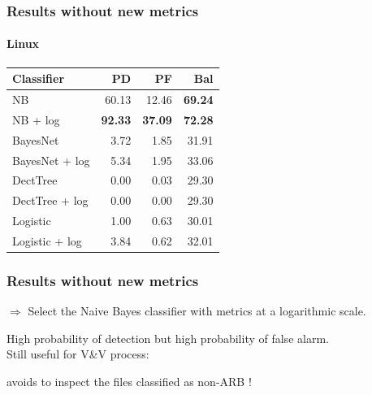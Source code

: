 \documentclass{beamer}
\begin{document}
\begin{frame}
 \frametitle{Results without new metrics}
 \framesubtitle{Linux}
 \begin{center}
 \begin{tabular}{lrrr}
  \hspace{0.2cm} Classifier & PD & PF & Bal\\
  \hline
  NB & 60.13 & 12.46 & \textbf{69.24}\\
  NB + log &  \textbf{92.33} & \textbf{37.09} & \textbf{72.28}\\
  BayesNet & 3.72 & 1.85 & 31.91\\
  BayesNet + log & 5.34 & 1.95 & 33.06\\
  DectTree & 0.00 & 0.03 & 29.30\\
  DectTree + log & 0.00 & 0.00 & 29.30\\
  Logistic & 1.00 & 0.63 & 30.01\\
  Logistic + log & 3.84 & 0.62 & 32.01\\
  \hline
 \end{tabular}
 \end{center}
\end{frame}

\begin{frame}
 \frametitle{Results without new metrics} %
 \begin{center}
  $\Longrightarrow$ \alert{Select the Naive Bayes classifier with metrics at a logarithmic scale.}
 \end{center}
 \vspace{1cm}
 High probability of detection but high probability of false alarm.\\
 Still useful for V\&V process:
 \begin{center}
  \alert{avoids to inspect the files classified as non-ARB !}
 \end{center}
\end{frame}
\end{document}
